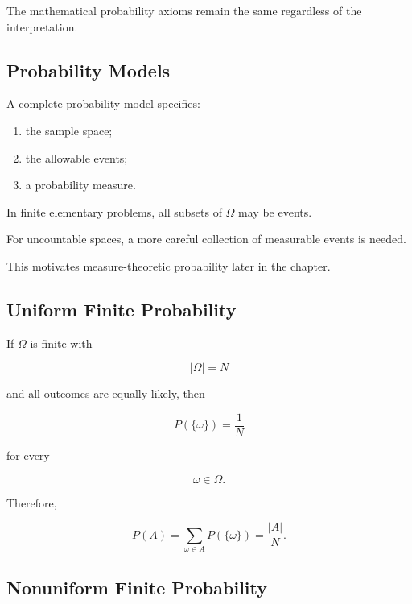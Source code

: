 The mathematical probability axioms remain the same regardless of the
interpretation.

\subsection{Probability Models}
\label{subsec:probability-models}

A complete probability model specifies:

\begin{enumerate}
    \item the sample space;
    \item the allowable events;
    \item a probability measure.
\end{enumerate}

In finite elementary problems, all subsets of \(\Omega\) may be events.

For uncountable spaces, a more careful collection of measurable events
is needed.

This motivates measure-theoretic probability later in the chapter.

\subsection{Uniform Finite Probability}
\label{subsec:uniform-finite-probability}

If \(\Omega\) is finite with

\[
|\Omega|=N
\]

and all outcomes are equally likely, then

\[
P(\{\omega\})
=
\frac1N
\]

for every

\[
\omega\in\Omega.
\]

Therefore,

\[
\boxed{
P(A)
=
\sum_{\omega\in A}P(\{\omega\})
=
\frac{|A|}{N}.
}
\]

\subsection{Nonuniform Finite Probability}
\label{subsec:nonuniform-finite-probability}


